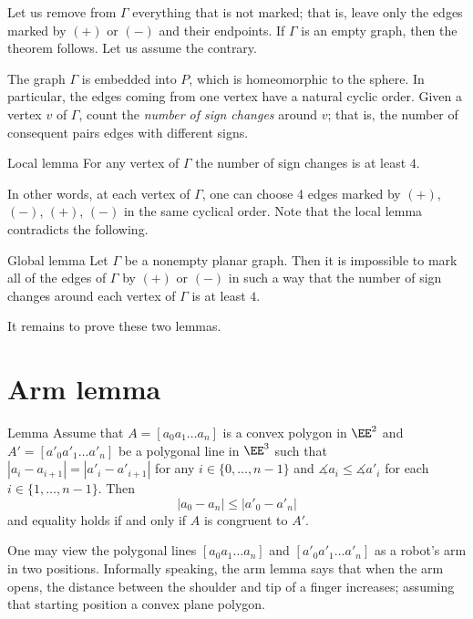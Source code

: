 Let us remove from $\Gamma$ everything that is not marked;
that is, leave only the edges marked by $(+)$ or $(-)$ and their endpoints.
If $\Gamma$ is an empty graph, then the theorem follows.
Let us assume the contrary.

The graph $\Gamma$ is embedded into $P$, which is homeomorphic to the sphere.
In particular, the edges coming from one vertex have a natural cyclic order. 
Given a vertex $v$ of $\Gamma$, count the \textit{number of sign changes} around $v$;
that is, the number of consequent pairs edges with different signs. 

\begin{thm}{Local lemma}\label{lem:local}
For any vertex of  $\Gamma$ the number of sign changes is at least $4$.
\end{thm}

In other words, at each vertex of $\Gamma$, one can choose 4 edges marked by $(+)$, $(-)$, $(+)$, $(-)$ in the same cyclical order.
Note that the local lemma contradicts the following.

\begin{thm}{Global lemma}\label{lem:global}
Let $\Gamma$ be a nonempty planar graph.
Then it is impossible to mark all of the edges of $\Gamma$ by $(+)$ or $(-)$
in such a way  that the number of sign changes around each vertex of $\Gamma$ is at least $4$.
\end{thm}

It remains to prove these two lemmas.
\qeds


\section{Arm lemma}

\begin{thm}{Lemma}\label{lem:arm}
Assume that $A=[a_0 a_1\dots a_n]$ is a convex polygon in $\EE^2$
and $A'=[a'_0 a'_1\dots a'_n]$ be a polygonal line in $\EE^3$
such that 
$|a_i-a_{i+1}|=|a'_i-a'_{i+1}|$ for any $i\in\{0,\dots,n-1\}$
and 
$\measuredangle a_i\le \measuredangle a'_i$
for each $i\in\{1,\dots,n-1\}$.
Then 
$$|a_0-a_n|\le |a'_0-a'_n|$$
and equality holds if and only if $A$ is congruent to $A'$.
\end{thm}

One may view the polygonal lines $[a_0a_1\dots a_n]$ and $[a'_0a'_1\dots a'_n]$ as a robot's arm in two positions.
Informally speaking, the arm lemma says that when the arm opens,
the distance between the shoulder and tip of a finger increases;
assuming that starting position a convex plane polygon.

